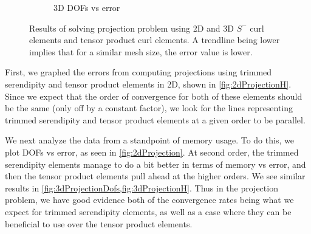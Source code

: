 \documentclass[format=acmsmall,screen,timestamp=false,a4paper]{acmart}
\newcommand\josh[1]{\textbf{\textcolor[rgb]{0,.5,1}{[Josh: #1]}}}
\begin{document}
\begin{figure}[h]
\begin{subfigure}[h]{0.5\textwidth}
    \caption{3D DOFs vs error}
    \label{fig:3dProjectionDofs}
  \end{subfigure}
  \caption{Results of solving projection problem using 2D and 3D $S^-$ curl elements and tensor product curl elements.  A trendline being lower implies that for a similar mesh size, the error value is lower.} 
\end{figure}
\newpage

First, we graphed the errors from computing projections using trimmed serendipity and tensor product elements in 2D, shown in \cref{fig:2dProjectionH}.  Since we expect that the order of convergence for both of these elements should be the same (only off by a constant factor), we look for the lines representing trimmed serendipity and tensor product elements at a given order to be parallel.
  
We next analyze the data from a standpoint of memory usage.  To do this, we plot DOFs vs error, as seen in \cref{fig:2dProjection}. At second order, the trimmed serendipity elements manage to do a bit better in terms of memory vs error, and then the tensor product elements pull ahead at the higher orders. We see similar results in \cref{fig:3dProjectionDofs,fig:3dProjectionH}.  Thus in the projection problem, we have good evidence both of the convergence rates being what we expect for trimmed serendipity elements, as well as a case where they can be beneficial to use over the tensor product elements.


 
\end{document}
